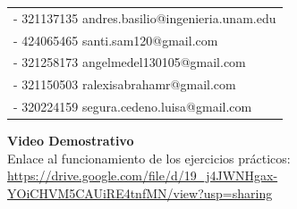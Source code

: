 \documentclass[a4paper, 11pt]{article}
\begin{document}
\begin{tabular}[t]{l}
    - 321137135 andres.basilio@ingenieria.unam.edu \\[0.5cm]
    - 424065465 santi.sam120@gmail.com \\[0.5cm]
    - 321258173 angelmedel130105@gmail.com\\[0.5cm]
    - 321150503 ralexisabrahamr@gmail.com \\[0.5cm]
    - 320224159 segura.cedeno.luisa@gmail.com \\[0.5cm]
\end{tabular} 

\newpage









\vspace{1.5cm}
\begin{center}
    \Large\textbf{Video Demostrativo} \\[0.5cm]
    \normalsize
    Enlace al funcionamiento de los ejercicios prácticos: \\[0.3cm]
    \url{https://drive.google.com/file/d/19_j4JWNHgax-YOiCHVM5CAUiRE4tnfMN/view?usp=sharing}
\end{center}
\end{document}
